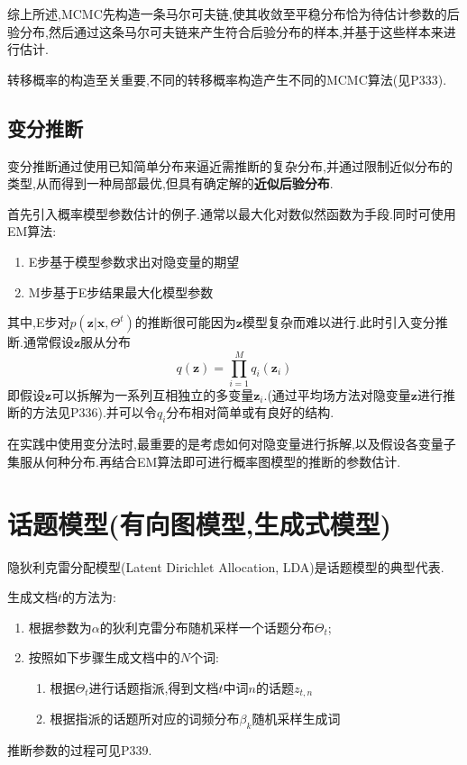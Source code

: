 综上所述,MCMC先构造一条马尔可夫链,使其收敛至平稳分布恰为待估计参数的后验分布,然后通过这条马尔可夫链来产生符合后验分布的样本,并基于这些样本来进行估计.

转移概率的构造至关重要,不同的转移概率构造产生不同的MCMC算法(见P333).

\subsection{变分推断}

变分推断通过使用已知简单分布来逼近需推断的复杂分布,并通过限制近似分布的类型,从而得到一种局部最优,但具有确定解的\textbf{近似后验分布}.

首先引入概率模型参数估计的例子.通常以最大化对数似然函数为手段.同时可使用EM算法:
\begin{enumerate}
\item E步基于模型参数求出对隐变量的期望
\item M步基于E步结果最大化模型参数
\end{enumerate}

其中,E步对$p(\bm z|\bm x, \Theta^t)$的推断很可能因为$\bm z$模型复杂而难以进行.此时引入变分推断.通常假设$\bm z$服从分布
\begin{equation}
q(\bm z)=\prod_{i=1}^Mq_i(\bm z_i)
\end{equation}
即假设$\bm z$可以拆解为一系列互相独立的多变量$\bm z_i$.(通过平均场方法对隐变量$\bm z$进行推断的方法见P336).并可以令$q_i$分布相对简单或有良好的结构.

在实践中使用变分法时,最重要的是考虑如何对隐变量进行拆解,以及假设各变量子集服从何种分布.再结合EM算法即可进行概率图模型的推断的参数估计.

\section{话题模型(有向图模型,生成式模型)}

隐狄利克雷分配模型(Latent Dirichlet Allocation, LDA)是话题模型的典型代表.

生成文档$t$的方法为:

\begin{enumerate}
\item 根据参数为$\alpha$的狄利克雷分布随机采样一个话题分布$\Theta_t$;
\item 按照如下步骤生成文档中的$N$个词:
    \begin{enumerate}
    \item 根据$\Theta_t$进行话题指派,得到文档$t$中词$n$的话题$z_{t,n}$
    \item 根据指派的话题所对应的词频分布$\beta_k$随机采样生成词
    \end{enumerate}
\end{enumerate}
推断参数的过程可见P339.

